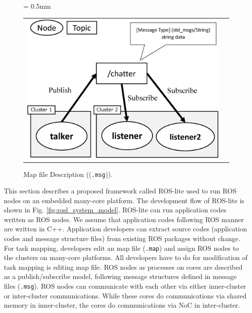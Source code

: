 \begin{figure}[!htbp]
  \tabcolsep = 0.5mm              %
  \begin{tabular}{cc}
    \begin{minipage}[!htbp]{0.59\textwidth}
      \centering
      \includegraphics[width=0.85\linewidth]{../figure/roslite/example.eps}
      \caption{The publish/subscribe model in ROS-lite.}
      \label{fig:rosl_example}
    \end{minipage}
    &
    \begin{minipage}[!htbp]{0.39\textwidth}
      
      \caption{Map file Description ((\texttt{.msg})).}
      \label{code:map_file}
    \end{minipage}
  \end{tabular}
\end{figure}

This section describes a proposed framework called ROS-lite used to run ROS nodes on an embedded many-core platform.
The development flow of ROS-lite is shown in Fig. \ref{fig:rosl_system_model}.
ROS-lite can run application codes written as ROS nodes.
We assume that application codes following ROS manner are written in C++.
Application developers can extract source codes (application codes and message structure files) from existing ROS packages without change.
For task mapping, developers edit an map file (\texttt{.map}) and assign ROS nodes to the clusters on many-core platforms.
All developers have to do for modification of task mapping is editing map file.
ROS nodes as processes on cores are described as a publish/subscribe model, following message structures defined in message files (\texttt{.msg}).
ROS nodes can communicate with each other via either inner-cluster or inter-cluster communications.
While these cores do communications via shared memory in inner-cluster, the cores do communications via NoC in inter-cluster.

